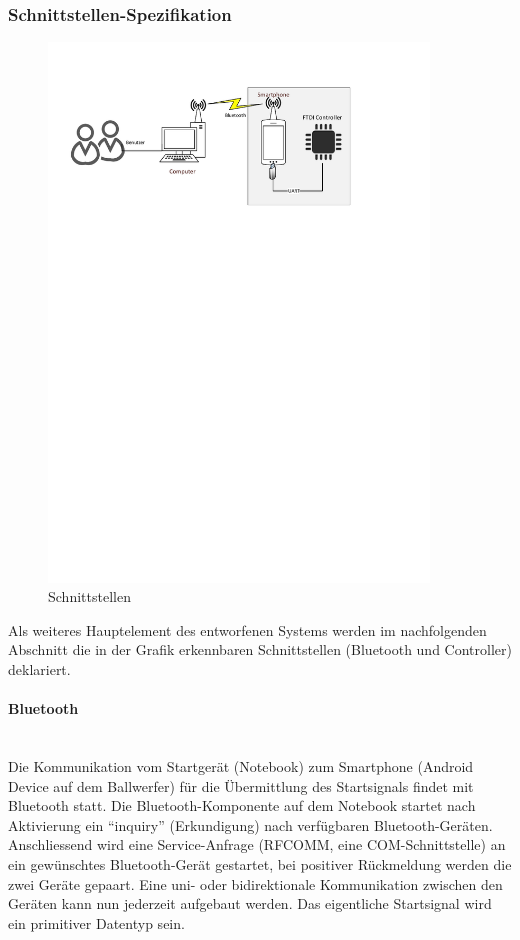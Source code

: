 	\subsubsection{Schnittstellen-Spezifikation}
		\begin{figure}[h!]
			\centering
			\includegraphics[width=0.9\textwidth,clip,trim= 12mm 205mm 43mm 24mm]
			{Enddokumentation/Loesungskonzept/Bilder/Schnittstellen.pdf}
			\caption{Schnittstellen}		
		\end{figure}
		Als weiteres Hauptelement des entworfenen Systems werden im nachfolgenden 
		Abschnitt die in der Grafik erkennbaren Schnittstellen (Bluetooth und Controller) 
		deklariert.
		\newpage
		\paragraph{Bluetooth}$~~$\vspace{2mm}\\
		Die Kommunikation vom Startgerät (Notebook) zum Smartphone (Android Device auf 
		dem Ballwerfer) für die Übermittlung des Startsignals findet mit Bluetooth statt. 
		Die Bluetooth-Komponente auf dem Notebook startet nach Aktivierung ein 
		\enquote{inquiry} (Erkundigung) nach verfügbaren Bluetooth-Geräten. Anschliessend 
		wird eine Service-Anfrage (RFCOMM, eine COM-Schnittstelle) an ein gewünschtes 
		Bluetooth-Gerät gestartet, bei positiver Rückmeldung werden die zwei Geräte gepaart. 
		Eine uni- oder bidirektionale Kommunikation zwischen den Geräten kann nun jederzeit 
		aufgebaut werden. Das eigentliche Startsignal wird ein primitiver Datentyp sein.
		
